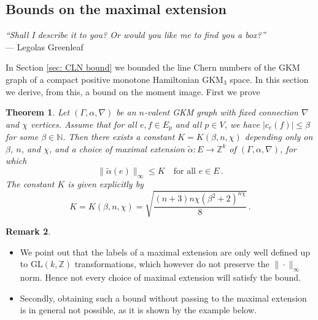 \documentclass[12pt,a4paper]{amsart}
\newcommand{\GL}{\mathrm{GL}}
\newcommand{\ZZ}{\mathbb{Z}}
\newtheorem{thm}{Theorem}[section]
\theoremstyle{plain}
\theoremstyle{definition}
\newtheorem{rem}[thm]{Remark}
\begin{document}
\subsection{Bounds on the maximal extension}\label{subseq: box}
\begin{center}
\textit{``Shall I describe it to you? Or would you like me to find you a box?''}\\ \vspace*{0.3cm}
{\hspace{5cm} --- Legolas Greenleaf}
\end{center}

In Section \ref{sec: CLN bound} we bounded the line Chern numbers of the GKM graph of a compact positive monotone Hamiltonian
 GKM$_3$ space. In this section we derive, from this, a bound on the moment image. First we prove
\begin{thm}\label{thm: Box}
Let $(\Gamma,\alpha,\nabla)$ be an $n$-valent GKM graph with fixed connection $\nabla$ and $\chi$ vertices. Assume that
for all $e,f\in E_p$ and all $p\in V$, we have $|c_e(f)|\leq \beta$ for some $\beta\in
\mathbb{N}$. Then there exists a constant $K=K(\beta,n,\chi)$ depending only on $\beta$,
$n$, and $\chi$, and a choice of maximal extension $\tilde\alpha\colon E\rightarrow \ZZ^k$
of $(\Gamma,\alpha,\nabla)$, for which 
\begin{equation}\label{inf bound alpha}
\| \tilde\alpha(e) \|_\infty\leq K\quad \text{for all  } e\in E\,.
\end{equation} 
The constant $K$ is given explicitly by
\begin{equation}\label{def K}
K=K(\beta,n,\chi)=\sqrt{\frac{(n+3)n\chi(\beta^2+2)^{{n\chi}}}{8}}\,.
\end{equation}
\end{thm}

\begin{rem}\label{rem: bound alpha}
\begin{itemize}
\item[(i)] We point out that the labels of a maximal extension are only well defined up to $\GL(k,\ZZ)$ transformations, which however do not preserve the $\|\cdot\|_\infty$ norm. 
Hence not every choice of maximal extension will satisfy the bound.
\item[(ii)] Secondly, obtaining such a bound without passing to the maximal extension is in general not possible, as it is shown by the example below.
\end{itemize}
\end{rem}
\end{document}
